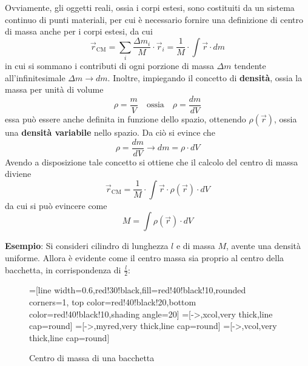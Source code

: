 \documentclass[a4paper]{extarticle}
\begin{document}
\vspace{1em}
\noindent
Ovviamente, gli oggetti reali, ossia i corpi estesi, sono costituiti da un sistema continuo di punti materiali, per cui è necessario fornire una definizione di centro di massa anche per i corpi estesi, da cui
\[\boxed{\vec r_{\text{CM}} = \sum_{i} \frac{\Delta m_i}{M} \cdot \vec r_i = \frac{1}{M} \cdot \int \vec r \cdot dm}\]
in cui si sommano i contributi di ogni porzione di massa $\Delta m$ tendente all'infinitesimale $\Delta m \to dm$. Inoltre, impiegando il concetto di \textbf{densità}, ossia la massa per unità di volume
\[\rho = \frac{m}{V} \hspace{1em} \text{ossia} \hspace{1em} \rho = \frac{dm}{dV}\]
essa può essere anche definita in funzione dello spazio, ottenendo $\rho(\vec r)$, ossia una \textbf{densità variabile} nello spazio. Da ciò si evince che
\[\rho = \frac{dm}{dV} \longrightarrow dm = \rho \cdot dV\]
Avendo a disposizione tale concetto si ottiene che il calcolo del centro di massa diviene
\[\boxed{\vec r_{\text{CM}} = \frac{1}{M} \cdot \int \vec r \cdot \rho(\vec r) \cdot dV}\]
da cui si può evincere come
\[M=\int \rho(\vec r) \cdot dV\]

\vspace{1em}
\noindent
\textbf{Esempio}: Si consideri cilindro di lunghezza $l$ e di massa $M$, avente una densità uniforme. Allora è evidente come il centro massa sia proprio al centro della bacchetta, in corrispondenza di $\frac{l}{2}$:

\begin{figure}[H]
  \centering
  =[line width=0.6,red!30!black,fill=red!40!black!10,rounded corners=1,
                    top color=red!40!black!20,bottom color=red!40!black!10,shading angle=20]
  =[->,xcol,very thick,line cap=round]
  =[->,myred,very thick,line cap=round]
  =[->,vcol,very thick,line cap=round]
  \caption{Centro di massa di una bacchetta}
  \label{fig:centro_di_massa_bacchetta}
\end{figure}
\end{document}
